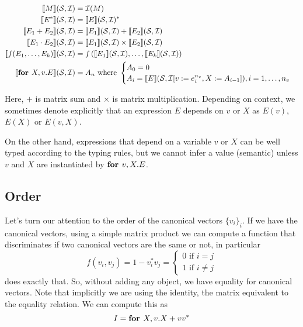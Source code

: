 \begin{align*}
\llbracket M \rrbracket(\mathcal{S},\mathcal{I})&=\mathcal{I} (M) \\
\llbracket E^* \rrbracket(\mathcal{S},\mathcal{I})&=\llbracket E \rrbracket(\mathcal{S},\mathcal{I})^* \\
\llbracket E_1+E_2 \rrbracket(\mathcal{S},\mathcal{I})&= \llbracket E_1 \rrbracket(\mathcal{S},\mathcal{I})+\llbracket E_2 \rrbracket(\mathcal{S},\mathcal{I})\\
\llbracket E_1\cdot E_2 \rrbracket(\mathcal{S},\mathcal{I})&= \llbracket E_1 \rrbracket(\mathcal{S},\mathcal{I})\times \llbracket E_2 \rrbracket(\mathcal{S},\mathcal{I})\\
\llbracket f(E_1,\ldots ,E_k) \rrbracket(\mathcal{S},\mathcal{I}) &= f\left(\llbracket E_1 \rrbracket(\mathcal{S},\mathcal{I}),\ldots , \llbracket E_k \rrbracket(\mathcal{S},\mathcal{I})\right)\\
\llbracket  \textbf{for } X,v. E  \rrbracket(\mathcal{S},\mathcal{I}) &= A_n \text{ where }
	\begin{cases}
	               A_0 = 0 \\
 	               A_i = \llbracket E \rrbracket(\mathcal{S},\mathcal{I}[v:= e^{n_v}_i, X:=A_{i-1}]), i=1,\ldots, n_v
	\end{cases}
\end{align*}

Here, $+$ is matrix sum and $\times$ is matrix multiplication. Depending on context, we sometimes denote explicitly that an expression $E$ depends on $v$ or $X$ as $E(v)$, $E(X)$ or $E(v,X)$.

On the other hand, expressions that depend on a variable $v$ or $X$ can be well typed according to the typing rules, but we cannot infer a value (semantic) unless $v$ and $X$ are instantiated by $\textbf{for } v,X. E$.

\subsection{Order}

Let's turn our attention to the order of the canonical vectors $\lbrace v_i\rbrace_i$. If we have the canonical vectors, using a simple matrix product we can compute a function that discriminates if two canonical vectors are the same or not, in particular
\[
  			f(v_i,v_j)=1-v_i^*v_j=\begin{cases}
               0 \text{ if } i=j \\
               1 \text{ if } i\neq j
            \end{cases}
		\]
does exactly that. So, without adding any object, we have equality for canonical vectors. Note that implicitly we are using the identity, the matrix equivalent to the equality relation. We can compute this as $$ I = \textbf{for } X, v. X+vv^*$$

